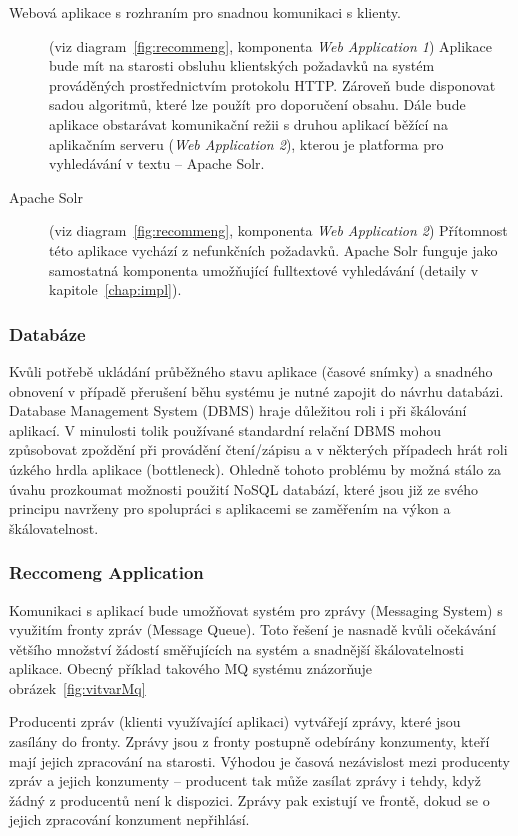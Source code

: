 \documentclass[thesis=M,czech]{FITthesis}[2014/05/07]
\begin{document}
\begin{description}
	\item[Webová aplikace s rozhraním pro snadnou komunikaci s klienty.]
	(viz diagram~\ref{fig:recommeng}, komponenta \emph{Web Application 1}) Aplikace bude mít na starosti obsluhu klientských požadavků na systém prováděných prostřednictvím protokolu HTTP. Zároveň bude disponovat sadou algoritmů, které lze použít pro doporučení obsahu. Dále bude aplikace obstarávat komunikační režii s druhou aplikací běžící na aplikačním serveru (\emph{Web Application 2}), kterou je platforma pro vyhledávání v textu – Apache Solr.

	\item[Apache Solr]
	(viz diagram~\ref{fig:recommeng}, komponenta \emph{Web Application 2}) Přítomnost této aplikace vychází z nefunkčních požadavků. Apache Solr funguje jako samostatná komponenta umožňující fulltextové vyhledávání (detaily v kapitole~\ref{chap:impl}).
\end{description}

\subsubsection{Databáze}

Kvůli potřebě ukládání průběžného stavu aplikace (časové snímky) a snadného obnovení v případě přerušení běhu systému je nutné zapojit do návrhu databázi. Database Management System (DBMS) hraje důležitou roli i při škálování aplikací. V minulosti tolik používané standardní relační DBMS mohou způsobovat zpoždění při provádění čtení/zápisu a v některých případech hrát roli úzkého hrdla aplikace (bottleneck). Ohledně tohoto problému by možná stálo za úvahu prozkoumat možnosti použití NoSQL databází, které jsou již ze svého principu navrženy pro spolupráci s aplikacemi se zaměřením na výkon a škálovatelnost.

\subsubsection{Reccomeng Application}

Komunikaci s aplikací bude umožňovat systém pro zprávy (Messaging System) s využitím fronty zpráv (Message Queue). Toto řešení je nasnadě kvůli očekávání většího množství žádostí směřujících na systém a snadnější škálovatelnosti aplikace. Obecný příklad takového MQ systému znázorňuje obrázek~\ref{fig:vitvarMq}

Producenti zpráv (klienti využívající aplikaci) vytvářejí zprávy, které jsou zasílány do fronty. Zprávy jsou z fronty postupně odebírány konzumenty, kteří mají jejich zpracování na starosti. Výhodou je časová nezávislost mezi producenty zpráv a jejich konzumenty – producent tak může zasílat zprávy i tehdy, když žádný z producentů není k dispozici. Zprávy pak existují ve frontě, dokud se o jejich zpracování konzument nepřihlásí.
\end{document}
